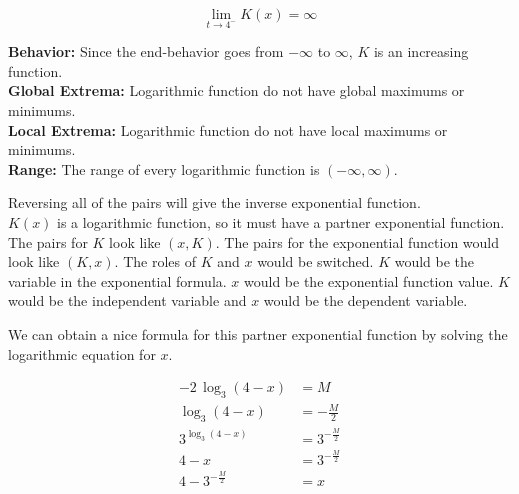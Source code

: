 \documentclass{ximera}
\begin{document}
\begin{example}
\begin{explanation}
\[
\lim\limits_{t \to 4^-} K(x) = \infty
\]




\textbf{Behavior:} Since the end-behavior goes from $-\infty$ to $\infty$, $K$ is an increasing function. \\


\textbf{Global Extrema:} Logarithmic function do not have global maximums or minimums. \\


\textbf{Local Extrema:} Logarithmic function do not have local maximums or minimums. \\



\textbf{Range:} The range of every logarithmic function is $(-\infty, \infty)$.




\end{explanation}





\end{example}









Reversing all of the pairs will give the inverse exponential function.  \\



$K(x)$ is a logarithmic function, so it must have a partner exponential function.  The pairs for $K$ look like $(x, K)$. The pairs for the exponential function would look like $(K, x)$.  The roles of $K$ and $x$ would be switched. $K$ would be the variable in the exponential formula. $x$ would be the exponential function value.  $K$ would be the independent variable and $x$ would be the dependent variable.


We can obtain a nice formula for this partner exponential function by solving the logarithmic equation for $x$.





\begin{align*}
-2 \, \log_3(4-x) & = M \\
\log_3(4-x) & = -\frac{M}{2} \\
3^{\log_3(4-x)} & = 3^{-\frac{M}{2}} \\
4 - x & = 3^{-\frac{M}{2}} \\
4 - 3^{-\frac{M}{2}} & = x \\
\end{align*}
\end{document}

